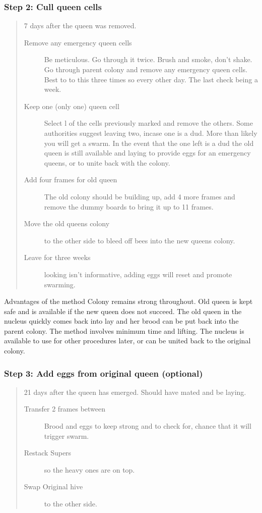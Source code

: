 \subsubsection*{Step 2: Cull queen cells}

\begin{quotation}
7 days after the queen was removed.
\begin{description}
  \item[Remove any emergency queen cells] Be meticulous.  Go through it twice.  Brush and smoke, don't shake.
	Go through parent colony and remove any emergency queen cells.  Best to to this three times so every other day.  The last check being a week.
  \item[Keep one (only one) queen cell]
	Select l of the cells previously marked and remove the others.
	Some authorities suggest leaving two, incase one is a dud.
	More than likely you will get a swarm.
	In the event that the one left is a dud the old queen is still available and laying to provide eggs for an emergency queens,
	or to unite back with the colony.
  \item[Add four frames for old queen] The old colony should be building up, add 4 more frames and remove the dummy boards to bring it up to 11 frames.
  \item[Move the old queens colony] to the other side to bleed off bees into the new queens colony.
  \item[Leave for three weeks] looking isn't informative, adding eggs will reset and promote swarming.

\end{description}
\end{quotation}

Advantages of the method
Colony remains strong throughout.
Old queen is kept safe and is available if the new queen does not succeed.
The old queen in the nucleus quickly comes back into lay and her brood can be put back into the parent colony.
The method involves minimum time and lifting.
The nucleus is available to use for other procedures later, or can be united back to the original colony.

\subsubsection*{Step 3: Add eggs from original queen (optional)}


\begin{quotation}
21 days after the queen has emerged.
Should have mated and be laying.

\begin{description}
  \item[Transfer 2 frames between] Brood and eggs to keep strong and to check for, chance that it will trigger swarm.
  \item[Restack Supers] so the heavy ones are on top.
  \item[Swap Original hive] to the other side.
\end{description}
\end{quotation}

